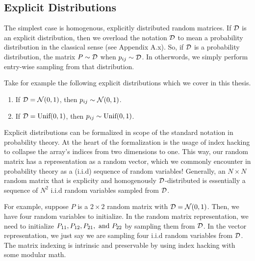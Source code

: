 
\subsection{Explicit Distributions}

The simplest case is homogenous, explicitly distributed random matrices. If $\mathcal{D}$ is an explicit distribution, then we overload the notation $\mathcal{D}$ to mean a probability distribution in the classical sense (see Appendix A.x). So, if $\mathcal{D}$ is a probability distribution, the matrix $P \sim \mathcal{D}$ when $p_{ij} \sim \mathcal{D}$. In otherwords, we simply perform entry-wise sampling from that distribution.

Take for example the following explicit distributions which we cover in this thesis.

\begin{enumerate}
\item  If $\mathcal{D} = \mathcal{N}(0,1)$, then $p_{ij} \sim \mathcal{N}(0,1)$.
\item  If $\mathcal{D} = \text{Unif}(0,1)$, then $p_{ij} \sim \text{Unif}(0,1)$.
\end{enumerate}

\begin{formalization}
Explicit distributions can be formalized in scope of the standard notation in probability theory. At the heart of the formalization is the usage of index hacking to collapse the array's indices from two dimensions to one. This way, our random matrix has a representation as a random vector, which we commonly encounter in probability theory as a (i.i.d) sequence of random variables! Generally, an $N \times N$ random matrix that is explicity and homogenously $\mathcal{D}$-distributed is essentially a sequence of $N^2$ i.i.d random variables sampled from $\mathcal{D}$.
\end{formalization}

\begin{example}[Formalization]
For example, suppose $P$ is a $2 \times 2$ random matrix with $\mathcal{D} = \mathcal{N}(0,1)$. Then, we have four random variables to initialize. In the random matrix representation, we need to initialize $P_{11}, P_{12}, P_{21}, \text{ and } P_{22}$ by sampling them from $\mathcal{D}$. In the vector representation, we just say we are sampling four i.i.d random variables from $\mathcal{D}$. The matrix indexing is intrinsic and preservable by using index hacking with some modular math.
\end{example}

